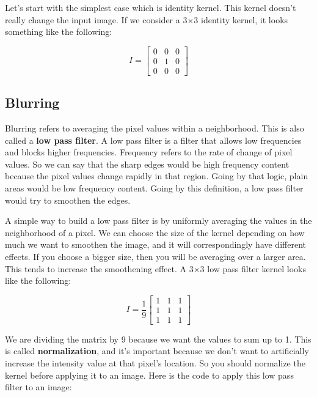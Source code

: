 Let's start with the simplest case which is identity kernel. This kernel doesn't really change the input image. If we consider a 3$\times$3 identity kernel, it looks something like the following:

\begin{center}
	\[
	\textit{I} =  
	\begin{bmatrix}
		0 & 0 & 0 \\
		0 & 1 & 0 \\
		0 & 0 & 0
	\end{bmatrix}
	\]
\end{center}

\subsection{Blurring}
Blurring refers to averaging the pixel values within a neighborhood. This is also called a \textbf{low pass filter}. A low pass filter is a filter that allows low frequencies and blocks higher frequencies. Frequency refers to the rate of change of pixel values. So we can say that the sharp edges would be high frequency content because the pixel values change rapidly in that region. Going by that logic, plain areas would be low frequency content. Going by this definition, a low pass filter would try to smoothen the edges.

A simple way to build a low pass filter is by uniformly averaging the values in the neighborhood of a pixel. We can choose the size of the kernel depending on how much we want to smoothen the image, and it will correspondingly have different effects. If you choose a bigger size, then you will be averaging over a larger area. This tends to increase the smoothening effect. A 3$\times$3 low pass filter kernel looks like the following:

\begin{center}
	\[
	\textit{I} = \frac{1}{9}  
	\begin{bmatrix}
		1 & 1 & 1 \\
		1 & 1 & 1 \\
		1 & 1 & 1
	\end{bmatrix}
	\]
\end{center}

We are dividing the matrix by 9 because we want the values to sum up to 1. This is called \textbf{normalization}, and it's important because we don't want to artificially increase the intensity value at that pixel's location. So you should normalize the kernel before applying it to an image. Here is the code to apply this low pass filter to an image:

